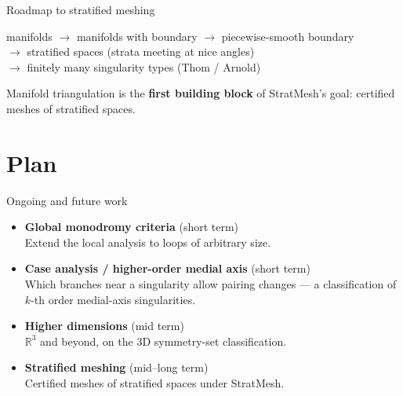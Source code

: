 \documentclass[
	11pt,
	aspectratio=169, %
]{beamer}
\newcommand{\R}{\mathbb{R}}
\begin{document}
\begin{frame}{Roadmap to stratified meshing}
    \begin{center}
        manifolds \;$\to$\; manifolds with boundary \;$\to$\; piecewise-smooth
        boundary \\[6pt] $\to$\; stratified spaces (strata meeting at nice angles)
        \\[6pt] $\to$\; finitely many singularity types (Thom / Arnold)
    \end{center}
    \vspace{0.8em}
    Manifold triangulation is the \textbf{first building block} of StratMesh's
    goal: certified meshes of stratified spaces.
\end{frame}

\section{Plan}

\begin{frame}{Ongoing and future work}
    \begin{itemize}
        \item \textbf{Global monodromy criteria} \hfill{\footnotesize(short term)}\\
              {\footnotesize Extend the local analysis to loops of arbitrary size.}
        \item \textbf{Case analysis / higher-order medial axis}
              \hfill{\footnotesize(short term)}\\
              {\footnotesize Which branches near a singularity allow pairing
              changes --- a classification of $k$-th order medial-axis
              singularities.}
        \item \textbf{Higher dimensions} \hfill{\footnotesize(mid term)}\\
              {\footnotesize $\R^3$ and beyond, on the 3D symmetry-set
              classification.}
        \item \textbf{Stratified meshing} \hfill{\footnotesize(mid--long term)}\\
              {\footnotesize Certified meshes of stratified spaces under StratMesh.}
    \end{itemize}
\end{frame}
\end{document}
